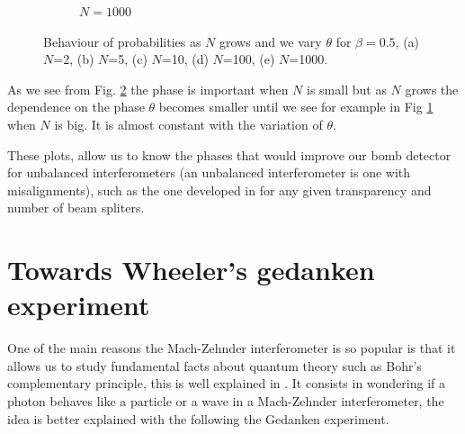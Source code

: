 \documentclass[12pt]{book}
\begin{document}
\begin{figure}[!t]
\begin{subfigure}[b]{0.30\linewidth}
\caption{$N=1000$ }
\label{1000}
\end{subfigure}
\caption{Behaviour of probabilities as $N$ grows and we vary $\theta$ for $\beta=0.5$, (a) $N$=2, (b) $N$=5, (c) $N$=10, (d) $N$=100, (e) $N$=1000.}
\label{con_fase}
\end{figure}

As we see from Fig. \ref{con_fase} the phase is important when $N$ is small but as $N$  grows the dependence on the phase $\theta$ becomes smaller until we see for example in Fig \ref{1000} when $N$ is big. It is almost constant with the variation of $\theta$.

These plots, allow us to know the phases that would improve our bomb detector for unbalanced interferometers (an unbalanced interferometer is one with misalignments), such as the one developed in \cite{Chao_2018} for any given transparency and number of beam spliters.


\section{Towards Wheeler's gedanken experiment}

One of the main reasons the Mach-Zehnder interferometer is so popular is that it allows us to study fundamental facts about quantum theory such as Bohr's complementary principle, this is well explained in \cite{delayed}. It consists in wondering if a photon behaves like a particle or a wave in a Mach-Zehnder interferometer, the idea is better explained with the following the Gedanken experiment.
\end{document}

